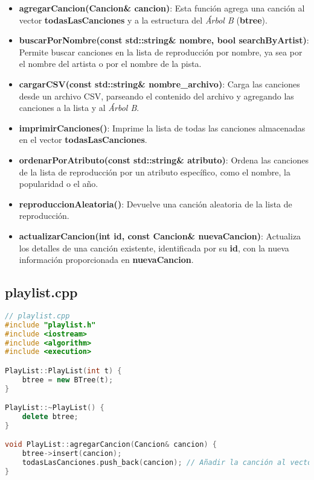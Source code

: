 \documentclass[corference]{IEEEtran}
\begin{document}
\begin{flushleft}
                \begin{itemize}[left=4em]
                    \item \textbf{agregarCancion(Cancion\& cancion)}: Esta función agrega una canción al vector \textbf{todasLasCanciones} y a la estructura del \textit{Árbol B} (\textbf{btree}).
                    \item \textbf{buscarPorNombre(const std::string\& nombre, bool searchByArtist)}: Permite buscar canciones en la lista de reproducción por nombre, ya sea por el nombre del artista o por el nombre de la pista.
                    \item \textbf{cargarCSV(const std::string\& nombre\_archivo)}: Carga las canciones desde un archivo CSV, parseando el contenido del archivo y agregando las canciones a la lista y al \textit{Árbol B}.
                    \item \textbf{imprimirCanciones()}: Imprime la lista de todas las canciones almacenadas en el vector \textbf{todasLasCanciones}.
                    \item \textbf{ordenarPorAtributo(const std::string\& atributo)}: Ordena las canciones de la lista de reproducción por un atributo específico, como el nombre, la popularidad o el año.
                    \item \textbf{reproduccionAleatoria()}: Devuelve una canción aleatoria de la lista de reproducción.
                    \item \textbf{actualizarCancion(int id, const Cancion\& nuevaCancion)}: Actualiza los detalles de una canción existente, identificada por su \textbf{id}, con la nueva información proporcionada en \textbf{nuevaCancion}.
                \end{itemize}
            
            \subsection{playlist.cpp}
            \begin{lstlisting}[language=C++, style=mystyle, caption={Código de la Clase Playlist}]
// playlist.cpp
#include "playlist.h"
#include <iostream>
#include <algorithm>
#include <execution> 

PlayList::PlayList(int t) {
    btree = new BTree(t);
}

PlayList::~PlayList() {
    delete btree;
}

void PlayList::agregarCancion(Cancion& cancion) {
    btree->insert(cancion);
    todasLasCanciones.push_back(cancion); // Añadir la canción al vector
}


\end{lstlisting}
\end{flushleft}
\end{document}
